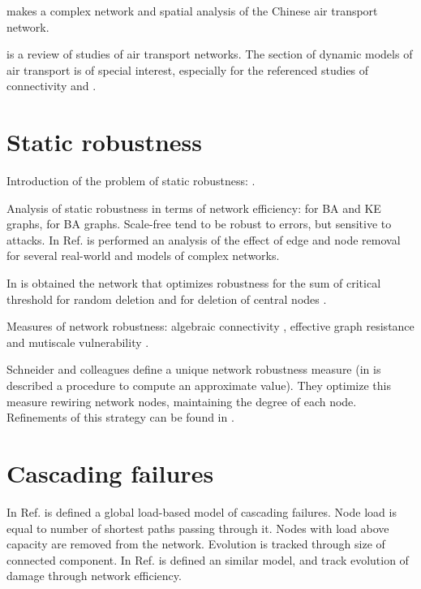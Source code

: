 \documentclass[12pt]{article}
\begin{document}
\cite{Lin2012a} makes a complex network and spatial analysis of the Chinese air transport network.\medskip

\cite{Zanin2013} is a review of studies of air transport networks. The section of dynamic models of air transport is of special interest, especially for the referenced studies of connectivity \cite{Burghouwt2005} and \cite{Malighetti2008}. 

\section{Static robustness}

Introduction of the problem of static robustness: \cite{Albert2000}. \medskip

Analysis of static robustness in terms of network efficiency: \cite{Crucitti2003}  for BA and KE graphs, \cite{Crucitti2004b} for BA graphs. Scale-free tend to be robust to errors, but sensitive to attacks. In Ref. \cite{Holme2002a} is performed an analysis of the effect of edge and node removal for several real-world and models of complex networks. \medskip

In \cite{Paul2005} is obtained the network that optimizes robustness for the sum of critical threshold for random deletion \cite{Cohen2000a} and for deletion of central nodes \cite{Cohen2001a}. \medskip

Measures of network robustness: algebraic connectivity \cite{Fiedler1973}, effective graph resistance \cite{Ellens2011} and mutiscale vulnerability \cite{Boccaletti2007}.\medskip

Schneider and colleagues \cite{Schneider2011} define a unique network robustness measure (in \cite{Hong2017} is described a procedure to compute an approximate value). They optimize this measure rewiring network nodes, maintaining the degree of each node. Refinements of this strategy can be found in \cite{Louzada2013, Yang2015, Zhou2014}.


\section{Cascading failures}

In Ref. \cite{Motter2002} is defined a global load-based model of cascading failures. Node load is equal to number of shortest paths passing through it. Nodes with load above capacity are removed from the network. Evolution is tracked through size of connected component. In Ref. \cite{Crucitti2004} is defined an similar model, and track evolution of damage through network efficiency. \medskip
\end{document}
